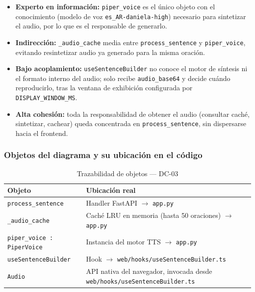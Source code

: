 \begin{itemize}[leftmargin=*, itemsep=2pt]
    \item \textbf{Experto en información:} \texttt{piper\_voice} es el único
    objeto con el conocimiento (modelo de voz \texttt{es\_AR-daniela-high})
    necesario para sintetizar el audio, por lo que es el responsable de
    generarlo.
    \item \textbf{Indirección:} \texttt{\_audio\_cache} media entre
    \texttt{process\_sentence} y \texttt{piper\_voice}, evitando resintetizar
    audio ya generado para la misma oración.
    \item \textbf{Bajo acoplamiento:} \texttt{useSentenceBuilder} no conoce
    el motor de síntesis ni el formato interno del audio; solo recibe
    \texttt{audio\_base64} y decide cuándo reproducirlo, tras la ventana de
    exhibición configurada por \texttt{DISPLAY\_WINDOW\_MS}.
    \item \textbf{Alta cohesión:} toda la responsabilidad de obtener el
    audio (consultar caché, sintetizar, cachear) queda concentrada en
    \texttt{process\_sentence}, sin dispersarse hacia el frontend.
\end{itemize}

\subsubsection{Objetos del diagrama y su ubicación en el código}

\begin{table}[H]
\centering
\begin{tabularx}{\textwidth}{@{}l X@{}}
\toprule
\textbf{Objeto} & \textbf{Ubicación real} \\
\midrule
\texttt{process\_sentence} & Handler FastAPI $\rightarrow$ \texttt{app.py} \\
\texttt{\_audio\_cache} & Caché LRU en memoria (hasta 50 oraciones) $\rightarrow$ \texttt{app.py} \\
\texttt{piper\_voice : PiperVoice} & Instancia del motor TTS $\rightarrow$ \texttt{app.py} \\
\texttt{useSentenceBuilder} & Hook $\rightarrow$ \texttt{web/hooks/useSentenceBuilder.ts} \\
\texttt{Audio} & API nativa del navegador, invocada desde \texttt{web/hooks/useSentenceBuilder.ts} \\
\bottomrule
\end{tabularx}
\caption{Trazabilidad de objetos --- DC-03}
\label{tab:col-objetos-dc03}
\end{table}

